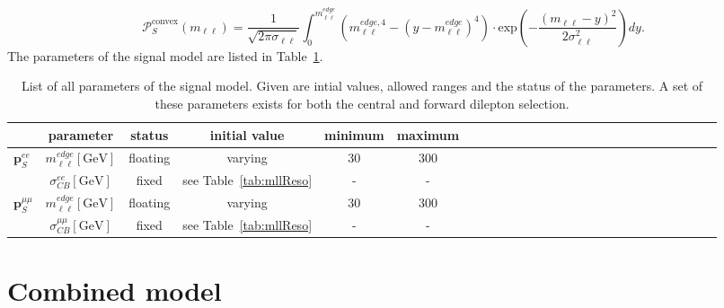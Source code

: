 \begin{equation*}
 {\mathcal{P}}_{S}^{\text{convex}}(m_{\ell\ell}) = \frac{1}{\sqrt{2\pi\sigma_{\ell\ell}}} \int_{0}^{m_{\ell\ell}^{edge}} (m_{\ell\ell}^{edge,4} -(y-m_{\ell\ell}^{edge})^4) \cdot \textrm{exp}\left( -\frac{(m_{\ell\ell}-y)^2}{2\sigma_{\ell\ell}^{2}}\right) dy.
\end{equation*}
The parameters of the signal model are listed in Table~\ref{tab:Fit_Par_Overview_Sig}.
\begin{table}[htbp]
\begin{center}
 \renewcommand{\arraystretch}{1.3}
 \caption{List of all parameters of the signal model. Given are intial values, allowed ranges and the status of the parameters. A set of these parameters exists for both the central and forward dilepton selection.\label{tab:Fit_Par_Overview_Sig}}
\begin{tabular}{l|c|c|c|c|ccccccccccccccccccccc}
& parameter & status & initial value & minimum & maximum \\ \hline
\multirow{2}{*}{$\mathbf{p}_{S}^{ee}$} & $m_{\ell\ell}^{edge} [\mathrm{GeV}]$ & floating & varying & 30 & 300 \\ 
& $\sigma_{CB}^{ee}  [\mathrm{GeV}]$ & fixed & see Table~\ref{tab:mllReso} & - & - \\ \hline
\multirow{2}{*}{$\mathbf{p}_{S}^{\mu\mu}$} & $m_{\ell\ell}^{edge} [\mathrm{GeV}]$ & floating & varying & 30 & 300 \\ 
& $\sigma_{CB}^{\mu\mu}  [\mathrm{GeV}]$ & fixed & see Table~\ref{tab:mllReso} & - & - \\
\end{tabular}

\end{center}
\end{table}

\section{Combined model}

